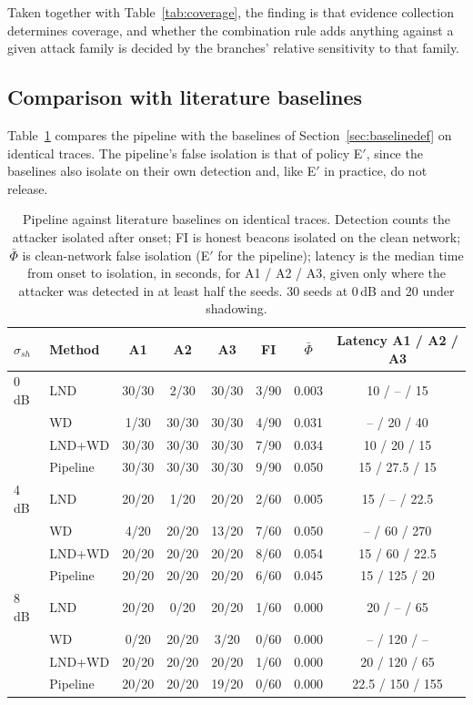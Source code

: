 Taken together with Table~\ref{tab:coverage}, the finding is that evidence
collection determines coverage, and whether the combination rule adds anything
against a given attack family is decided by the branches' relative
sensitivity to that family.

\subsection{Comparison with literature baselines}
\label{sec:baselines}

Table~\ref{tab:baselines} compares the pipeline with the baselines of
Section~\ref{sec:baselinedef} on identical traces. The pipeline's false
isolation is that of policy E$'$, since the baselines also isolate on their
own detection and, like E$'$ in practice, do not release.

\begin{table}[!t]
\caption{Pipeline against literature baselines on identical traces. Detection
counts the attacker isolated after onset; FI is honest beacons isolated on the
clean network; $\bar\Phi$ is clean-network false isolation (E$'$ for the
pipeline); latency is the median time from onset to isolation, in seconds,
for A1 / A2 / A3, given only where the attacker was detected in at least half
the seeds. 30 seeds at 0\,dB and 20 under shadowing.}
\label{tab:baselines}
\centering
\small
\setlength{\tabcolsep}{3.5pt}
\begin{tabular}{@{}llcccccc@{}}
\toprule
$\sigma_{sh}$ & Method & A1 & A2 & A3 & FI & $\bar\Phi$ & Latency A1 / A2 / A3 \\
\midrule
0\,dB & LND & 30/30 & 2/30 & 30/30 & 3/90 & 0.003 & 10 / -- / 15 \\
      & WD & 1/30 & 30/30 & 30/30 & 4/90 & 0.031 & -- / 20 / 40 \\
      & LND+WD & 30/30 & 30/30 & 30/30 & 7/90 & 0.034 & 10 / 20 / 15 \\
      & Pipeline & 30/30 & 30/30 & 30/30 & 9/90 & 0.050 & 15 / 27.5 / 15 \\
4\,dB & LND & 20/20 & 1/20 & 20/20 & 2/60 & 0.005 & 15 / -- / 22.5 \\
      & WD & 4/20 & 20/20 & 13/20 & 7/60 & 0.050 & -- / 60 / 270 \\
      & LND+WD & 20/20 & 20/20 & 20/20 & 8/60 & 0.054 & 15 / 60 / 22.5 \\
      & Pipeline & 20/20 & 20/20 & 20/20 & 6/60 & 0.045 & 15 / 125 / 20 \\
8\,dB & LND & 20/20 & 0/20 & 20/20 & 1/60 & 0.000 & 20 / -- / 65 \\
      & WD & 0/20 & 20/20 & 3/20 & 0/60 & 0.000 & -- / 120 / -- \\
      & LND+WD & 20/20 & 20/20 & 20/20 & 1/60 & 0.000 & 20 / 120 / 65 \\
      & Pipeline & 20/20 & 20/20 & 19/20 & 0/60 & 0.000 & 22.5 / 150 / 155 \\
\bottomrule
\end{tabular}
\end{table}

